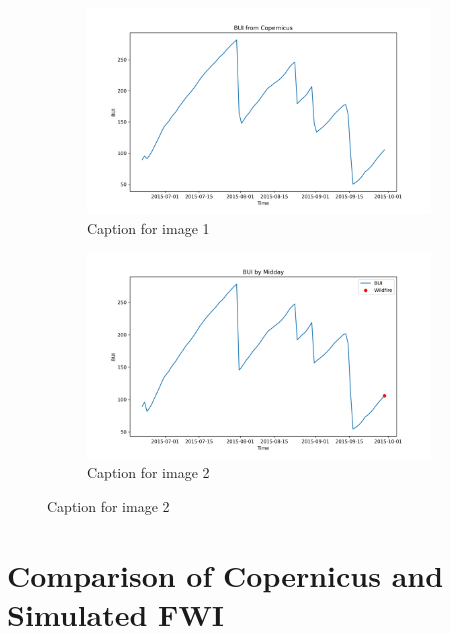 \begin{figure}[h]
\caption{HELLo}
    \centering
    \begin{subfigure}{0.49\textwidth}
        \centering
        \includegraphics[width=\textwidth]{graphs/2015MesmoSitio/2015CopernicusBUI12.png}
        \caption{Caption for image 1}
        \label{fig:img1}
    \end{subfigure}
    \hfill
    \begin{subfigure}{0.49\textwidth}
        \centering
        \includegraphics[width=\textwidth]{graphs/2015MesmoSitio/2015CalcBUI12.png}
        \caption{Caption for image 2}
        \label{fig:img2}
    \end{subfigure}
    \label{fig:both_images}
\end{figure}

\FloatBarrier

\section{Comparison of Copernicus and Simulated FWI}

